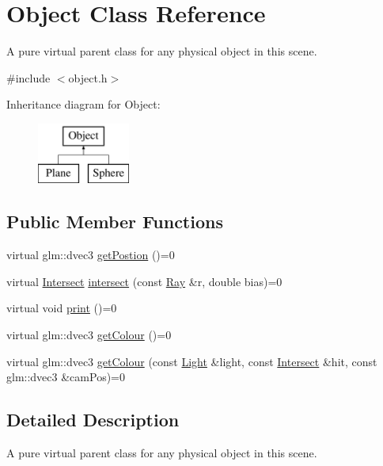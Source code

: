 \hypertarget{class_object}{}\section{Object Class Reference}
\label{class_object}


A pure virtual parent class for any physical object in this scene.  




{\ttfamily \#include $<$object.\+h$>$}

Inheritance diagram for Object\+:\begin{figure}[H]
\begin{center}
\leavevmode
\includegraphics[height=2.000000cm]{class_object}
\end{center}
\end{figure}
\subsection*{Public Member Functions}
\begin{DoxyCompactItemize}
\item 
virtual glm\+::dvec3 \mbox{\hyperlink{class_object_a71cb3da0e19b83f2558bf406abc9db68}{get\+Postion}} ()=0
\item 
virtual \mbox{\hyperlink{struct_intersect}{Intersect}} \mbox{\hyperlink{class_object_a16d022cf54624baea89c542a44e6db26}{intersect}} (const \mbox{\hyperlink{struct_ray}{Ray}} \&r, double bias)=0
\item 
virtual void \mbox{\hyperlink{class_object_ad81452e5a38455eff025d85ef1da7307}{print}} ()=0
\item 
virtual glm\+::dvec3 \mbox{\hyperlink{class_object_a96a5bb5dcad4c340caa1d806fb5bd572}{get\+Colour}} ()=0
\item 
virtual glm\+::dvec3 \mbox{\hyperlink{class_object_abecc5668197c7222b5c9180a9738f69b}{get\+Colour}} (const \mbox{\hyperlink{class_light}{Light}} \&light, const \mbox{\hyperlink{struct_intersect}{Intersect}} \&hit, const glm\+::dvec3 \&cam\+Pos)=0
\end{DoxyCompactItemize}


\subsection{Detailed Description}
A pure virtual parent class for any physical object in this scene. 


